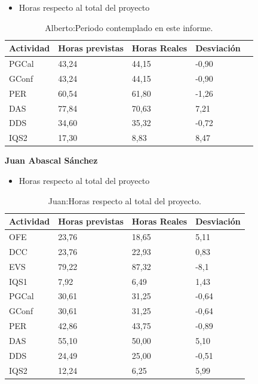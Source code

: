 \begin{itemize}
\item Horas respecto al total del proyecto
\end{itemize}
\begin{table}[H]
\begin{center}
\begin{tabular}{ l l l l l }
	 Actividad & Horas previstas & Horas Reales & Desviación \\ \hline \hline

PGCal	&	43,24	&	44,15	&	-0,90	\\ \hline
GConf	&	43,24	&	44,15	&	-0,90	\\ \hline
PER	&	60,54	&	61,80	&	-1,26	\\ \hline
DAS	&	77,84	&	70,63	&	7,21	\\ \hline
DDS	&	34,60	&	35,32	&	-0,72	\\ \hline
IQS2	&	17,30	&	8,83	&	8,47	\\ \hline
\end{tabular}
\caption{Alberto:Periodo contemplado en este informe.}
\label{tab:Alberto:PeriodoContempladoInforme_2}
\end{center}
\end{table}

\newpage

\textbf{Juan Abascal Sánchez}
\begin{itemize}
\item Horas respecto al total del proyecto
\end{itemize}
\begin{table}[H]
\begin{center}
\begin{tabular}{ l l l l }
  Actividad & Horas previstas & Horas Reales & Desviación \\ \hline \hline
OFE	&	23,76	&	18,65	&	5,11	\\ \hline
DCC	&	23,76	&	22,93	&	0,83	\\ \hline
EVS	&	79,22	&	87,32	&	-8,1	\\ \hline
IQS1	&	7,92	&	6,49	&	1,43	\\ \hline
PGCal	&	30,61	&	31,25	&	-0,64	\\ \hline
GConf	&	30,61	&	31,25	&	-0,64	\\ \hline
PER	&	42,86	&	43,75	&	-0,89	\\ \hline
DAS	&	55,10	&	50,00	&	5,10	\\ \hline
DDS	&	24,49	&	25,00	&	-0,51	\\ \hline
IQS2	&	12,24	&	6,25	&	5,99	\\ \hline
\end{tabular}
\caption{Juan:Horas respecto al total del proyecto.}
\label{tab:Juan:HorasTotalInforme_2}
\end{center}
\end{table}

